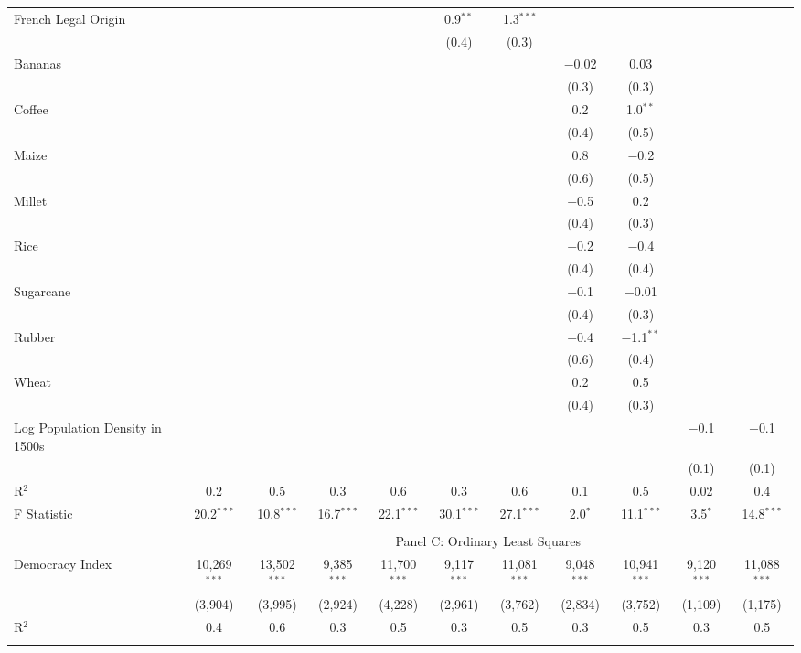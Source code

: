 \begin{table}[!htbp]
\begin{threeparttable}
\begin{tabular}{@{\extracolsep{0pt}}lcccccccccc}
  French Legal Origin &  &  &  &  & 0.9$^{**}$ & 1.3$^{***}$ &  &  &  &  \\ 
  &  &  &  &  & (0.4) & (0.3) &  &  &  &  \\ 
  Bananas &  &  &  &  &  &  & $-$0.02 & 0.03 &  &  \\ 
  &  &  &  &  &  &  & (0.3) & (0.3) &  &  \\ 
  Coffee &  &  &  &  &  &  & 0.2 & 1.0$^{**}$ &  &  \\ 
  &  &  &  &  &  &  & (0.4) & (0.5) &  &  \\ 
  Maize &  &  &  &  &  &  & 0.8 & $-$0.2 &  &  \\ 
  &  &  &  &  &  &  & (0.6) & (0.5) &  &  \\ 
  Millet &  &  &  &  &  &  & $-$0.5 & 0.2 &  &  \\ 
  &  &  &  &  &  &  & (0.4) & (0.3) &  &  \\ 
  Rice &  &  &  &  &  &  & $-$0.2 & $-$0.4 &  &  \\ 
  &  &  &  &  &  &  & (0.4) & (0.4) &  &  \\ 
  Sugarcane &  &  &  &  &  &  & $-$0.1 & $-$0.01 &  &  \\ 
  &  &  &  &  &  &  & (0.4) & (0.3) &  &  \\ 
  Rubber &  &  &  &  &  &  & $-$0.4 & $-$1.1$^{**}$ &  &  \\ 
  &  &  &  &  &  &  & (0.6) & (0.4) &  &  \\ 
  Wheat &  &  &  &  &  &  & 0.2 & 0.5 &  &  \\ 
  &  &  &  &  &  &  & (0.4) & (0.3) &  &  \\ 
  Log Population Density in 1500s &  &  &  &  &  &  &  &  & $-$0.1 & $-$0.1 \\ 
  &  &  &  &  &  &  &  &  & (0.1) & (0.1) \\ 
R$^{2}$ & 0.2 & 0.5 & 0.3 & 0.6 & 0.3 & 0.6 & 0.1 & 0.5 & 0.02 & 0.4 \\ 
F Statistic & 20.2$^{***}$ & 10.8$^{***}$ & 16.7$^{***}$ & 22.1$^{***}$ & 30.1$^{***}$ & 27.1$^{***}$ & 2.0$^{*}$ & 11.1$^{***}$ & 3.5$^{*}$ & 14.8$^{***}$ \\ 
 \hline \\[-1.8ex] 
  & \multicolumn{10}{c}{Panel C: Ordinary Least Squares} \\
 Democracy Index & 10,269$^{***}$ & 13,502$^{***}$ & 9,385$^{***}$ & 11,700$^{***}$ & 9,117$^{***}$ & 11,081$^{***}$ & 9,048$^{***}$ & 10,941$^{***}$ & 9,120$^{***}$ & 11,088$^{***}$ \\ 
  & (3,904) & (3,995) & (2,924) & (4,228) & (2,961) & (3,762) & (2,834) & (3,752) & (1,109) & (1,175) \\ 
R$^{2}$ & 0.4 & 0.6 & 0.3 & 0.5 & 0.3 & 0.5 & 0.3 & 0.5 & 0.3 & 0.5 \\ 
 \hline \\[-1.8ex] 


\end{tabular}
\end{threeparttable}
\end{table}
